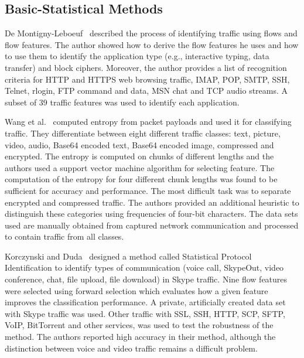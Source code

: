 \subsection{Basic-Statistical Methods}\label{subsec:basic-statistical}

De Montigny-Leboeuf~\cite{DeMontigny-Leboeuf-2005-Flow} described the process of identifying traffic using flows and flow features. The author showed how to derive the flow features he uses and how to use them to identify the application type (e.g., interactive typing, data transfer) and block ciphers. Moreover, the author provides a list of recognition criteria for HTTP and HTTPS web browsing traffic, IMAP, POP, SMTP, SSH, Telnet, rlogin, FTP command and data, MSN chat and TCP audio streams. A subset of 39 traffic features was used to identify each application.

Wang et al.~\cite{Wang-2011-Using} computed entropy from packet payloads and used it for classifying traffic. They differentiate between eight different traffic classes: text, picture, video, audio, Base64 encoded text, Base64 encoded image, compressed and encrypted. The entropy is computed on chunks of different lengths and the authors used a support vector machine algorithm for selecting feature. The computation of the entropy for four different chunk lengths was found to be sufficient for accuracy and performance. The most difficult task was to separate encrypted and compressed traffic. The authors provided an additional heuristic to distinguish these categories using frequencies of four-bit characters. The data sets used are manually obtained from captured network communication and processed to contain traffic from all classes.

Korczynski and Duda~\cite{Korczynski-2012-Classifying} designed a method called Statistical Protocol Identification to identify types of communication (voice call, SkypeOut, video conference, chat, file upload, file download) in Skype traffic. Nine flow features were selected using forward selection which evaluates how a given feature improves the classification performance. A private, artificially created data set with Skype traffic was used. Other traffic with SSL, SSH, HTTP, SCP, SFTP, VoIP, BitTorrent and other services, was used to test the robustness of the method. The authors reported high accuracy in their method, although the distinction between voice and video traffic remains a difficult problem.

